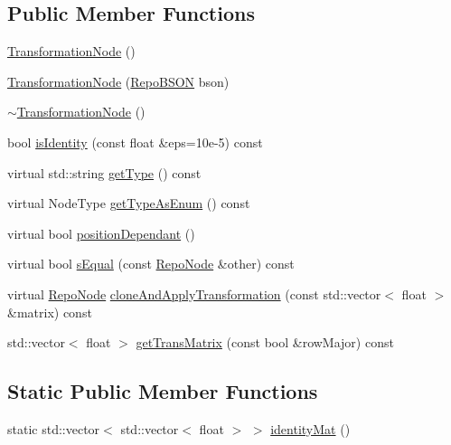\subsection*{Public Member Functions}
\begin{DoxyCompactItemize}
\item 
\hyperlink{classrepo_1_1core_1_1model_1_1_transformation_node_a4ed71fa34f550f4b47c21c8692c9f224}{Transformation\+Node} ()
\item 
\hyperlink{classrepo_1_1core_1_1model_1_1_transformation_node_a67b879ee0759867301de573ff16b8267}{Transformation\+Node} (\hyperlink{classrepo_1_1core_1_1model_1_1_repo_b_s_o_n}{Repo\+B\+S\+O\+N} bson)
\item 
\hyperlink{classrepo_1_1core_1_1model_1_1_transformation_node_a257896cca60b0abb300081a41da68a85}{$\sim$\+Transformation\+Node} ()
\item 
bool \hyperlink{classrepo_1_1core_1_1model_1_1_transformation_node_a60a86aff26b5d47c4aaf1db5bd9b7c74}{is\+Identity} (const float \&eps=10e-\/5) const 
\item 
virtual std\+::string \hyperlink{classrepo_1_1core_1_1model_1_1_transformation_node_a7e0b577dccbdbcab1e833b4da3121e83}{get\+Type} () const 
\item 
virtual Node\+Type \hyperlink{classrepo_1_1core_1_1model_1_1_transformation_node_ae24b2692960c32fed8b8b1ebf732a333}{get\+Type\+As\+Enum} () const 
\item 
virtual bool \hyperlink{classrepo_1_1core_1_1model_1_1_transformation_node_aef0c61c652ac425139a063c5e5c1832b}{position\+Dependant} ()
\item 
virtual bool \hyperlink{classrepo_1_1core_1_1model_1_1_transformation_node_ae580f6d1f6e6d331180ab6bb408f7e66}{s\+Equal} (const \hyperlink{classrepo_1_1core_1_1model_1_1_repo_node}{Repo\+Node} \&other) const 
\item 
virtual \hyperlink{classrepo_1_1core_1_1model_1_1_repo_node}{Repo\+Node} \hyperlink{classrepo_1_1core_1_1model_1_1_transformation_node_ad7ee2c9234712c2c697e06c02b34ed9b}{clone\+And\+Apply\+Transformation} (const std\+::vector$<$ float $>$ \&matrix) const 
\item 
std\+::vector$<$ float $>$ \hyperlink{classrepo_1_1core_1_1model_1_1_transformation_node_ae8f87497de15d3aa0d45298cd0dd32b8}{get\+Trans\+Matrix} (const bool \&row\+Major) const 
\end{DoxyCompactItemize}
\subsection*{Static Public Member Functions}
\begin{DoxyCompactItemize}
\item 
static std\+::vector$<$ std\+::vector$<$ float $>$ $>$ \hyperlink{classrepo_1_1core_1_1model_1_1_transformation_node_ac6723324b4ef9d6c0aacf53572a46d7f}{identity\+Mat} ()
\end{DoxyCompactItemize}
